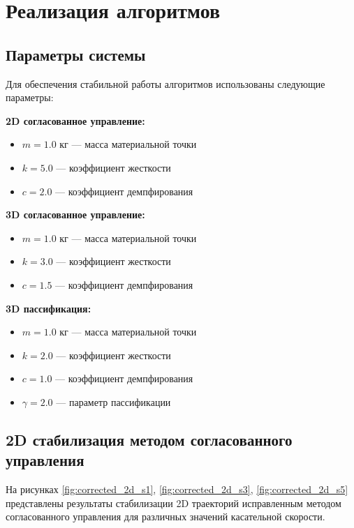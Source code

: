 \section{Реализация алгоритмов}

\subsection{Параметры системы}

Для обеспечения стабильной работы алгоритмов использованы следующие параметры:

\textbf{2D согласованное управление:}
\begin{itemize}
\item $m = 1.0$ кг --- масса материальной точки
\item $k = 5.0$ --- коэффициент жесткости
\item $c = 2.0$ --- коэффициент демпфирования
\end{itemize}

\textbf{3D согласованное управление:}
\begin{itemize}
\item $m = 1.0$ кг --- масса материальной точки
\item $k = 3.0$ --- коэффициент жесткости
\item $c = 1.5$ --- коэффициент демпфирования
\end{itemize}

\textbf{3D пассификация:}
\begin{itemize}
\item $m = 1.0$ кг --- масса материальной точки
\item $k = 2.0$ --- коэффициент жесткости
\item $c = 1.0$ --- коэффициент демпфирования
\item $\gamma = 2.0$ --- параметр пассификации
\end{itemize}

\subsection{2D стабилизация методом согласованного управления}

На рисунках \ref{fig:corrected_2d_s1}, \ref{fig:corrected_2d_s3}, \ref{fig:corrected_2d_s5} представлены результаты стабилизации 2D траекторий исправленным методом согласованного управления для различных значений касательной скорости.

